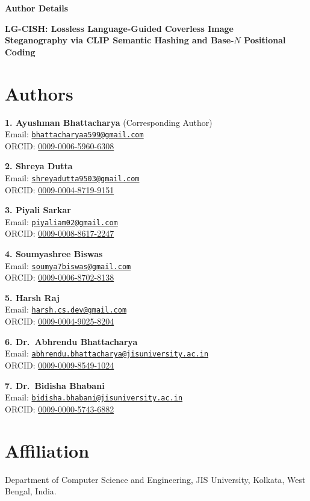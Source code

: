 \documentclass[11pt]{article}
\begin{document}
\begin{center}
{\Large\bfseries Author Details}\par\vspace{1.2em}
{\large\bfseries LG-CISH: Lossless Language-Guided Coverless Image\\
Steganography via CLIP Semantic Hashing and Base-$N$ Positional Coding}
\end{center}

\section*{Authors}

\textbf{1. Ayushman Bhattacharya} (Corresponding Author)\\
Email: \href{mailto:bhattacharyaa599@gmail.com}{\texttt{bhattacharyaa599@gmail.com}}\\
ORCID: \href{https://orcid.org/0009-0006-5960-6308}{0009-0006-5960-6308}

\textbf{2. Shreya Dutta}\\
Email: \href{mailto:shreyadutta9503@gmail.com}{\texttt{shreyadutta9503@gmail.com}}\\
ORCID: \href{https://orcid.org/0009-0004-8719-9151}{0009-0004-8719-9151}

\textbf{3. Piyali Sarkar}\\
Email: \href{mailto:piyaliam02@gmail.com}{\texttt{piyaliam02@gmail.com}}\\
ORCID: \href{https://orcid.org/0009-0008-8617-2247}{0009-0008-8617-2247}

\textbf{4. Soumyashree Biswas}\\
Email: \href{mailto:soumya7biswas@gmail.com}{\texttt{soumya7biswas@gmail.com}}\\
ORCID: \href{https://orcid.org/0009-0006-8702-8138}{0009-0006-8702-8138}

\textbf{5. Harsh Raj}\\
Email: \href{mailto:harsh.cs.dev@gmail.com}{\texttt{harsh.cs.dev@gmail.com}}\\
ORCID: \href{https://orcid.org/0009-0004-9025-8204}{0009-0004-9025-8204}

\textbf{6. Dr.\ Abhrendu Bhattacharya}\\
Email: \href{mailto:abhrendu.bhattacharya@jisuniversity.ac.in}{\texttt{abhrendu.bhattacharya@jisuniversity.ac.in}}\\
ORCID: \href{https://orcid.org/0009-0009-8549-1024}{0009-0009-8549-1024}

\textbf{7. Dr.\ Bidisha Bhabani}\\
Email: \href{mailto:bidisha.bhabani@jisuniversity.ac.in}{\texttt{bidisha.bhabani@jisuniversity.ac.in}}\\
ORCID: \href{https://orcid.org/0009-0000-5743-6882}{0009-0000-5743-6882}

\section*{Affiliation}

Department of Computer Science and Engineering, JIS University, Kolkata,
West Bengal, India.
\end{document}
